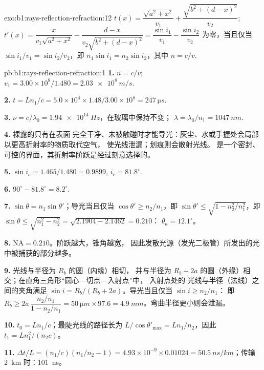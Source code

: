 \begin{solution}{exo:b1:rays-reflection-refraction:12}
$t(x) = \dfrac{\sqrt{a^2 + x^2}}{v_1} + \dfrac{\sqrt{b^2 + (d - x)^2}}{v_2}$;
$t'(x) = \dfrac{x}{v_1\sqrt{a^2 + x^2}} - \dfrac{d - x}{v_2\sqrt{b^2 + (d - x)^2}}
= \dfrac{\sin i_1}{v_1} - \dfrac{\sin i_2}{v_2}$ 为零，当且仅当
$\sin i_1/v_1 = \sin i_2/v_2$，即 $n_1\sin i_1 = n_2\sin i_2$，其中
$n = c/v$.
\end{solution}

\begin{solution}{pb:b1:rays-reflection-refraction:1}
\textbf{1.} $n = c/v$; $v_1 = 3.00\times10^8/1.480 = \qty{2.03e8}{m/s}$.

\textbf{2.} $t = Ln_1/c = 5.0\times10^4 \times 1.48/3.00\times10^8 =
\qty{247}{\micro s}$.

\textbf{3.} $\nu = c/\lambda_0 = \qty{1.94e14}{Hz}$，在玻璃中保持不变；
$\lambda = \lambda_0/n_1 = \qty{1047}{nm}$.

\textbf{4.} 裸露的只有在表面
完全干净、未被触碰时才能导光：灰尘、水或手握处会局部以更高折射率的物质取代空气，
使光线泄漏；划痕则会散射光线。
是一个密封、可控的界面，其折射率阶跃是经过刻意选择的。

\textbf{5.} $\sin i_c = 1.465/1.480 = 0.9899$, $i_c = 81.8^\circ$.

\textbf{6.} $90^\circ - 81.8^\circ = 8.2^\circ$.

\textbf{7.} $\sin\theta = n_1\sin\theta'$；导光当且仅当 $\cos\theta' \geq
n_2/n_1$，即 $\sin\theta' \leq \sqrt{1 - n_2^2/n_1^2}$，即
$\sin\theta \leq \sqrt{n_1^2 - n_2^2} = \sqrt{2.1904 - 2.1462} = 0.210$：
$\theta_a = 12.1^\circ$。

\textbf{8.} $\mathrm{NA} = 0.210$。阶跃越大，锥角越宽，
因此发散光源（发光二极管）所发出的光中被捕获的部分越多。

\textbf{9.} 光线与半径为 $R_b$ 的圆（内缘）相切，
并与半径为 $R_b + 2a$ 的圆（外缘）相交；在直角三角形“圆心—切点—入射点”中，
入射点处的
光线与半径（法线）之间的夹角满足
$\sin i = R_b/(R_b + 2a)$。导光当且仅当 $\sin i \geq n_2/n_1$：
即 $R_b \geq 2a\,\dfrac{n_2/n_1}{1 - n_2/n_1} = \qty{50}{\micro m} \times 97.6
= \qty{4.9}{mm}$。弯曲半径更小则会泄漏。

\textbf{10.} $t_0 = Ln_1/c$；最陡光线的路径长为 $L/\cos\theta'_{\max} =
Ln_1/n_2$，因此 $t_1 = Ln_1^2/(n_2 c)$。

\textbf{11.} $\Delta t/L = (n_1/c)(n_1/n_2 - 1) = 4.93\times10^{-9} \times
0.01024 = \qty{50.5}{ns/km}$；传输 \qty{2}{km} 时：\qty{101}{ns}。


\end{solution}
